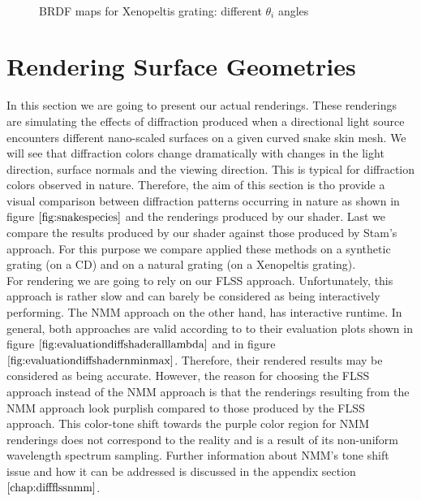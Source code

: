 \begin{figure}[H]
  \centering
~
~
  
\caption[BRDF Map: Varying Viewing Angles]{BRDF maps for Xenopeltis grating: different $\theta_i$ angles}
\label{fig:brdfmapsxenodiffthetaiangles}
\end{figure}

\section{Rendering Surface Geometries}
\label{sec:snakegeomrenderings}
In this section we are going to present our actual renderings. These renderings are simulating the effects of diffraction produced when a directional light source encounters different nano-scaled surfaces on a given curved snake skin mesh. We will see that diffraction colors change dramatically with changes in the light direction, surface normals and the viewing direction. This is typical for diffraction colors observed in nature. Therefore, the aim of this section is tho provide a visual comparison between diffraction patterns occurring in nature as shown in figure $\ref{fig:snakespecies}$ and the renderings produced by our shader. Last we compare the results produced by our shader against those produced by Stam's approach. For this purpose we compare applied these methods on a synthetic grating (on a CD) and on a natural grating (on a Xenopeltis grating). \\

For rendering we are going to rely on our FLSS approach. Unfortunately, this approach is rather slow and can barely be considered as being interactively performing. The NMM approach on the other hand, has interactive runtime. In general, both approaches are valid according to to their evaluation plots shown in figure $\ref{fig:evaluationdiffshaderalllambda}$ and in figure $\ref{fig:evaluationdiffshadernminmax}$. Therefore, their rendered results may be considered as being accurate. However, the reason for choosing the FLSS approach instead of the NMM approach is that the renderings resulting from the NMM approach look purplish compared to those produced by the FLSS approach. This color-tone shift towards the purple color region for NMM renderings does not correspond to the reality and is a result of its non-uniform wavelength spectrum sampling. Further information about NMM's tone shift issue and how it can be addressed is discussed in the appendix section $\ref{chap:diffflssnmm}$. \\

